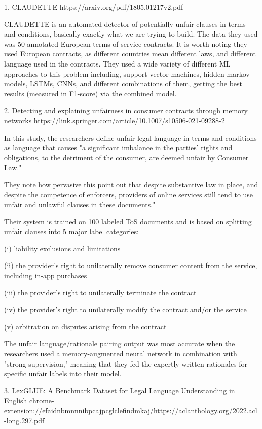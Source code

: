 \documentclass[11pt,a4paper]{article}
\begin{document}
1. CLAUDETTE
https://arxiv.org/pdf/1805.01217v2.pdf

CLAUDETTE is an automated detector of potentially unfair clauses in terms and conditions, basically exactly what we are trying to build. The data they used was 50 annotated European terms of service contracts. It is worth noting they used European contracts, as different countries mean different laws, and different language used in the contracts. They used a wide variety of different ML approaches to this problem including, support vector machines, hidden markov models, LSTMs, CNNs, and different combinations of them, getting the best results (measured in F1-score) via the combined model.  

2. Detecting and explaining unfairness in consumer contracts through memory networks
https://link.springer.com/article/10.1007/s10506-021-09288-2

In this study, the researchers define unfair legal language in terms and conditions as language that causes "a significant imbalance in the parties' rights and obligations, to the detriment of the consumer, are deemed unfair by Consumer Law."

They note how pervasive this point out that despite substantive law in place, and despite the competence of enforcers, providers of online services still tend to use unfair and unlawful clauses in these documents."

Their system is trained on 100 labeled ToS documents and is based on splitting unfair clauses into 5 major label categories:

(i) liability exclusions and limitations

(ii) the provider’s right to unilaterally remove consumer content from the service, including in-app purchases

(iii) the provider’s right to unilaterally terminate the contract

(iv) the provider’s right to unilaterally modify the contract and/or the service

(v) arbitration on disputes arising from the contract

The unfair language/rationale pairing output was most accurate when the researchers used a memory-augmented neural network in combination with "strong supervision," meaning that they fed the expertly written rationales for specific unfair labels into their model.

3. LexGLUE: A Benchmark Dataset for Legal Language Understanding in English
chrome-extension://efaidnbmnnnibpcajpcglclefindmkaj/https://aclanthology.org/2022.acl-long.297.pdf
\end{document}
